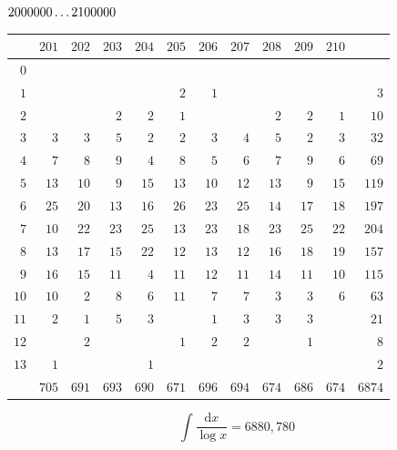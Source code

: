 \clearpage
\noindent\begin{minipage}{\linewidth}\centering
{}
\(2000000\mathinner{.\,.\,.}2100000\)\par\smallskip
\begingroup\fontsize{10.5}{11.5}\selectfont\setlength{\tabcolsep}{3.5pt}\renewcommand{\arraystretch}{1}
\begin{tabular}{r|rrrrrrrrrr|r}\hline
 & $201$ & $202$ & $203$ & $204$ & $205$ & $206$ & $207$ & $208$ & $209$ & $210$ &  \\ \hline
$0$ &  &  &  &  &  &  &  &  &  &  &  \\
$1$ &  &  &  &  & $2$ & $1$ &  &  &  &  & $3$ \\
$2$ &  &  & $2$ & $2$ & $1$ &  &  & $2$ & $2$ & $1$ & $10$ \\
$3$ & $3$ & $3$ & $5$ & $2$ & $2$ & $3$ & $4$ & $5$ & $2$ & $3$ & $32$ \\
$4$ & $7$ & $8$ & $9$ & $4$ & $8$ & $5$ & $6$ & $7$ & $9$ & $6$ & $69$ \\
$5$ & $13$ & $10$ & $9$ & $15$ & $13$ & $10$ & $12$ & $13$ & $9$ & $15$ & $119$ \\
$6$ & $25$ & $20$ & $13$ & $16$ & $26$ & $23$ & $25$ & $14$ & $17$ & $18$ & $197$ \\
$7$ & $10$ & $22$ & $23$ & $25$ & $13$ & $23$ & $18$ & $23$ & $25$ & $22$ & $204$ \\
$8$ & $13$ & $17$ & $15$ & $22$ & $12$ & $13$ & $12$ & $16$ & $18$ & $19$ & $157$ \\
$9$ & $16$ & $15$ & $11$ & $4$ & $11$ & $12$ & $11$ & $14$ & $11$ & $10$ & $115$ \\
$10$ & $10$ & $2$ & $8$ & $6$ & $11$ & $7$ & $7$ & $3$ & $3$ & $6$ & $63$ \\
$11$ & $2$ & $1$ & $5$ & $3$ &  & $1$ & $3$ & $3$ & $3$ &  & $21$ \\
$12$ &  & $2$ &  &  & $1$ & $2$ & $2$ &  & $1$ &  & $8$ \\
$13$ & $1$ &  &  & $1$ &  &  &  &  &  &  & $2$ \\
\hline
 & $705$ & $691$ & $693$ & $690$ & $671$ & $696$ & $694$ & $674$ & $686$ & $674$ & $6874$ \\ \hline
\end{tabular}\par\endgroup
\setlength{\abovedisplayskip}{6pt}\setlength{\belowdisplayskip}{4pt}
\[\int\frac{\mathrm{d}x}{\log x}=6880{,}780\]
\end{minipage}\par

